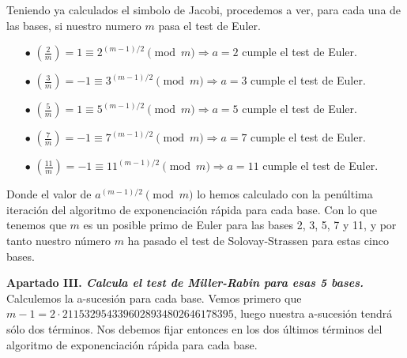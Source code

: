 \documentclass[fleqn]{article}
\begin{document}
    Teniendo ya calculados el simbolo de Jacobi, procedemos a ver, para cada una de las bases, si nuestro numero $m$ pasa el test de Euler.
    \begin{enumerate}
        \item[$\bullet$] $\left(\frac{2}{m}\right) = 1 \equiv 2^{(m-1)/2} \pmod{m} \Rightarrow a = 2 $ cumple el test de Euler.
        \item[$\bullet$] $\left(\frac{3}{m}\right) = -1 \equiv 3^{(m-1)/2} \pmod{m} \Rightarrow a = 3 $ cumple el test de Euler.
        \item[$\bullet$] $\left(\frac{5}{m}\right) = 1 \equiv 5^{(m-1)/2} \pmod{m} \Rightarrow a = 5 $ cumple el test de Euler.
        \item[$\bullet$] $\left(\frac{7}{m}\right) = -1 \equiv 7^{(m-1)/2} \pmod{m} \Rightarrow a = 7 $ cumple el test de Euler.
        \item[$\bullet$] $\left(\frac{11}{m}\right) = -1 \equiv 11^{(m-1)/2} \pmod{m} \Rightarrow a = 11 $ cumple el test de Euler.
    \end{enumerate}

    Donde el valor de $a^{(m-1)/2} \pmod{m}$ lo hemos calculado con la penúltima iteración del algoritmo de exponenciación rápida para cada base.
    Con lo que tenemos que $m$ es un posible primo de Euler para las bases 2, 3, 5, 7 y 11, y por tanto nuestro número $m$ ha pasado el test de 
    Solovay-Strassen para estas cinco bases.



    \newpage
    \textbf{Apartado III. \textit{Calcula el test de Miller-Rabin para esas 5 bases.}}
    Calculemos la a-sucesión para cada base. Vemos primero que $m-1 = 2 \cdot 2115329543396028934802646178395$, luego nuestra
    a-sucesión tendrá sólo dos términos. Nos debemos fijar entonces en los dos últimos términos del algoritmo de exponenciación 
    rápida para cada base.\\
\end{document}
